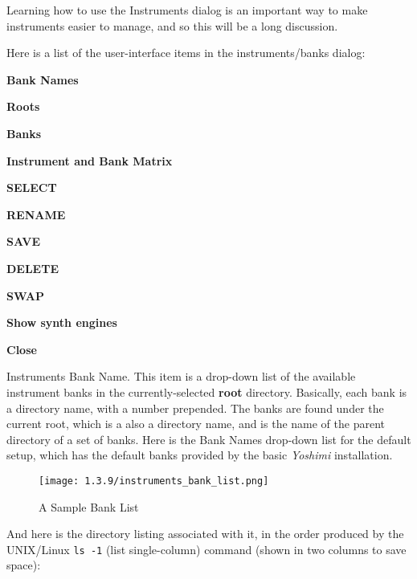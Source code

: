   Learning how to use the Instruments dialog is an important way to make
   instruments easier to manage, and so this will be a long discussion.


   Here is a list of the user-interface items in the instruments/banks dialog:

   \begin{enumber}
      \item \textbf{Bank Names}
      \item \textbf{Roots}
      \item \textbf{Banks}
      \item \textbf{Instrument and Bank Matrix}
      \item \textbf{SELECT}
      \item \textbf{RENAME}
      \item \textbf{SAVE}
      \item \textbf{DELETE}
      \item \textbf{SWAP}
      \item \textbf{Show synth engines}
      \item \textbf{Close}
   \end{enumber}

   \setcounter{ItemCounter}{0}      %

   Instruments Bank Name.
   This item is a drop-down list of the available instrument banks in the
   currently-selected \textbf{root} directory.
   Basically, each bank is a directory name, with a number prepended.
   The banks are found under the current root, which is a also a directory
   name, and is the name of the parent directory of a set of banks.
   Here is the Bank Names drop-down list for the default setup, which has the
   default banks provided by the basic \textsl{Yoshimi} installation.

\begin{figure}[H]
   \centering 
   \texttt{[image: 1.3.9/instruments\_bank\_list.png]}
   \caption[A Sample Bank List]{A Sample Bank List}
   \label{fig:bank_list}
\end{figure}

   And here is the directory listing associated with it, in the order
   produced by the UNIX/Linux \texttt{ls -1}
   (list single-column) command (shown in
   two columns to save space):


